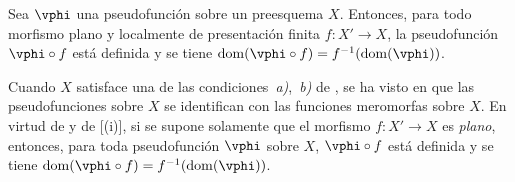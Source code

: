 \begin{corollary}[20.3.12]
\label{IV.20.3.12}
Sea $\vphi$ una pseudofunción sobre un preesquema $X$.
Entonces, para todo morfismo plano y localmente de presentación finita $f:X'\to X$, la pseudofunción $\vphi\circ f$ está definida y se tiene $\operatorname{dom}(\vphi\circ f)=f^{-1}(\operatorname{dom}(\vphi))$.
\end{corollary}


\begin{remark}[20.3.13]
\label{IV.20.3.13}

Cuando $X$ satisface una de las condiciones~\emph{a)},~\emph{b)} de , se ha visto en  que las pseudofunciones sobre $X$ se identifican con las funciones meromorfas sobre $X$.
En virtud de  y de [(i)], si se supone solamente que el morfismo $f:X'\to X$ es \emph{plano}, entonces, para toda pseudofunción $\vphi$ sobre $X$, $\vphi\circ f$ está definida y se tiene $\operatorname{dom}(\vphi\circ f)=f^{-1}(\operatorname{dom}(\vphi))$.
\end{remark}
